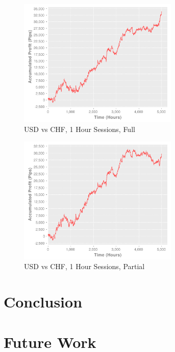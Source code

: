 \documentclass[letterpaper]{article}
\begin{document}
\begin{figure}[!t]
  \centering
  \includegraphics[width=3.0in]{usdchf60-of}
  \caption{USD vs CHF, 1 Hour Sessions, Full}
  \label{usdchf60-of}
\end{figure}

\begin{figure}[!t]
  \centering
  \includegraphics[width=3.0in]{usdchf60-op}
  \caption{USD vs CHF, 1 Hour Sessions, Partial}
  \label{usdchf60-op}
\end{figure}

\clearpage

\section{Conclusion}
\label{conclusion}
\section{Future Work}
\label{future-work}

\clearpage



\end{document}
